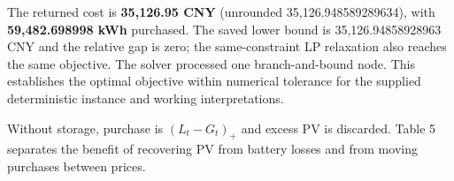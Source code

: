 The returned cost is \textbf{35,126.95 CNY} (unrounded 35,126.948589289634), with \textbf{59,482.698998 kWh} purchased. The saved lower bound is 35,126.94858928963 CNY and the relative gap is zero; the same-constraint LP relaxation also reaches the same objective. The solver processed one branch-and-bound node. This establishes the optimal objective within numerical tolerance for the supplied deterministic instance and working interpretations.

Without storage, purchase is \((L_t-G_t)_+\) and excess PV is discarded. Table 5 separates the benefit of recovering PV from battery losses and from moving purchases between prices.

\Needspace{88.1pt}
\begingroup
\fontsize{8.3}{9.96}\selectfont
\setlength{\tabcolsep}{3.2pt}
\renewcommand{\arraystretch}{1.12}
\setlength{\LTleft}{0pt plus 1fill}\setlength{\LTright}{0pt plus 1fill}
\setlength{\LTcapwidth}{\linewidth}

